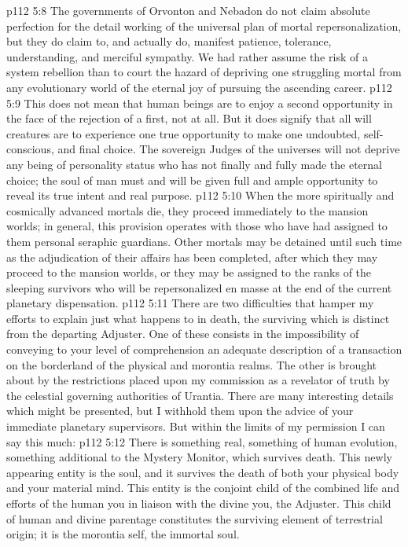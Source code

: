 \vs p112 5:8 The governments of Orvonton and Nebadon do not claim absolute perfection for the detail working of the universal plan of mortal repersonalization, but they do claim to, and actually do, manifest patience, tolerance, understanding, and merciful sympathy. We had rather assume the risk of a system rebellion than to court the hazard of depriving one struggling mortal from any evolutionary world of the eternal joy of pursuing the ascending career.
\vs p112 5:9 This does not mean that human beings are to enjoy a second opportunity in the face of the rejection of a first, not at all. But it does signify that all will creatures are to experience one true opportunity to make one undoubted, self\hyp{}conscious, and final choice. The sovereign Judges of the universes will not deprive any being of personality status who has not finally and fully made the eternal choice; the soul of man must and will be given full and ample opportunity to reveal its true intent and real purpose.
\vs p112 5:10 When the more spiritually and cosmically advanced mortals die, they proceed immediately to the mansion worlds; in general, this provision operates with those who have had assigned to them personal seraphic guardians. Other mortals may be detained until such time as the adjudication of their affairs has been completed, after which they may proceed to the mansion worlds, or they may be assigned to the ranks of the sleeping survivors who will be repersonalized en masse at the end of the current planetary dispensation.
\vs p112 5:11 \pc There are two difficulties that hamper my efforts to explain just what happens to  in death, the surviving  which is distinct from the departing Adjuster. One of these consists in the impossibility of conveying to your level of comprehension an adequate description of a transaction on the borderland of the physical and morontia realms. The other is brought about by the restrictions placed upon my commission as a revelator of truth by the celestial governing authorities of Urantia. There are many interesting details which might be presented, but I withhold them upon the advice of your immediate planetary supervisors. But within the limits of my permission I can say this much:
\vs p112 5:12 There is something real, something of human evolution, something additional to the Mystery Monitor, which survives death. This newly appearing entity is the soul, and it survives the death of both your physical body and your material mind. This entity is the conjoint child of the combined life and efforts of the human you in liaison with the divine you, the Adjuster. This child of human and divine parentage constitutes the surviving element of terrestrial origin; it is the morontia self, the immortal soul.

